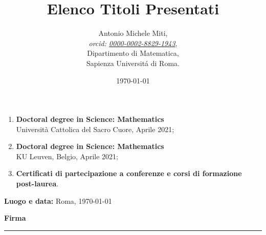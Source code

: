 \documentclass[a4paper]{article}
\title{Elenco Titoli Presentati}
\date{\today}
\author{
	Antonio Michele Miti,\\
	\emph{orcid: \href{https://orcid.org/0000-0002-8829-1943}{0000-0002-8829-1943}},
	\\
	Dipartimento di Matematica,\\
	Sapienza Universit\'a di Roma.
}
\begin{document}
	\maketitlecd

\begin{enumerate}[leftmargin=*, label=\arabic*.]
    \item \textbf{Doctoral degree in Science: Mathematics} \\
    Università Cattolica del Sacro Cuore, Aprile 2021;

    \item \textbf{Doctoral degree in Science: Mathematics} \\
     KU Leuven, Belgio, Aprile 2021;

    \item \textbf{Certificati di partecipazione a conferenze e corsi di formazione post-laurea}.
\end{enumerate}


\vfill

\noindent\begin{minipage}[t]{0.5\textwidth}
\textbf{Luogo e data:} Roma, \today
\end{minipage}%
\hfill
\begin{minipage}[t]{0.4\textwidth}
\begin{flushright}
\textbf{Firma}\\[2em] %
\rule{5cm}{0.4pt}
\end{flushright}
\end{minipage}

  
\end{document}
